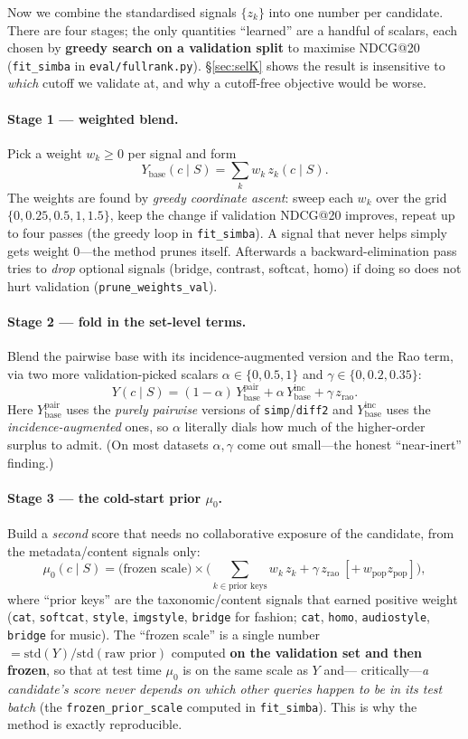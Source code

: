 \documentclass[11pt]{article}
\theoremstyle{remark}
\newcommand{\code}[1]{\texttt{\small #1}}
\begin{document}
Now we combine the standardised signals $\{z_k\}$ into one number per candidate. There are four stages; the only
quantities ``learned'' are a handful of scalars, each chosen by \textbf{greedy search on a validation split} to
maximise NDCG@20 (\code{fit\_simba} in \code{eval/fullrank.py}). \S\ref{sec:selK} shows the result is
insensitive to \emph{which} cutoff we validate at, and why a cutoff-free objective would be worse.

\paragraph{Stage 1 --- weighted blend.} Pick a weight $w_k\ge 0$ per signal and form
\[
  Y_{\text{base}}(c\mid S)=\sum_k w_k\,z_k(c\mid S).
\]
The weights are found by \emph{greedy coordinate ascent}: sweep each $w_k$ over the grid
$\{0,0.25,0.5,1,1.5\}$, keep the change if validation NDCG@20 improves, repeat up to four passes
(the greedy loop in \code{fit\_simba}). A signal that never helps simply gets weight $0$---the method prunes itself.
Afterwards a backward-elimination pass tries to \emph{drop} optional signals (bridge, contrast, softcat, homo) if
doing so does not hurt validation (\code{prune\_weights\_val}).

\paragraph{Stage 2 --- fold in the set-level terms.} Blend the pairwise base with its incidence-augmented version and
the Rao term, via two more validation-picked scalars $\alpha\in\{0,0.5,1\}$ and $\gamma\in\{0,0.2,0.35\}$:
\[
  Y(c\mid S)=(1-\alpha)\,Y_{\text{base}}^{\text{pair}}+\alpha\,Y_{\text{base}}^{\text{inc}}+\gamma\,z_{\text{rao}}.
\]
Here $Y_{\text{base}}^{\text{pair}}$ uses the \emph{purely pairwise} versions of \code{simp}/\code{diff2} and
$Y_{\text{base}}^{\text{inc}}$ uses the \emph{incidence-augmented} ones, so $\alpha$ literally dials how much of the
higher-order surplus to admit. (On most datasets $\alpha,\gamma$ come out small---the honest ``near-inert'' finding.)

\paragraph{Stage 3 --- the cold-start prior $\mu_0$.} Build a \emph{second} score that needs no collaborative
exposure of the candidate, from the metadata/content signals only:
\[
  \mu_0(c\mid S)=\text{(frozen scale)}\times\Big(\sum_{k\in\text{prior keys}}w_k\,z_k+\gamma\,z_{\text{rao}}\ [+\,w_{\text{pop}}z_{\text{pop}}]\Big),
\]
where ``prior keys'' are the taxonomic/content signals that earned positive weight (\code{cat}, \code{softcat},
\code{style}, \code{imgstyle}, \code{bridge} for fashion; \code{cat}, \code{homo}, \code{audiostyle}, \code{bridge}
for music). The ``frozen scale'' is a single number $=\mathrm{std}(Y)/\mathrm{std}(\text{raw prior})$ computed
\textbf{on the validation set and then frozen}, so that at test time $\mu_0$ is on the same scale as $Y$ and---
critically---\emph{a candidate's score never depends on which other queries happen to be in its test batch}
(the \code{frozen\_prior\_scale} computed in \code{fit\_simba}). This is why the method is exactly reproducible.
\end{document}
